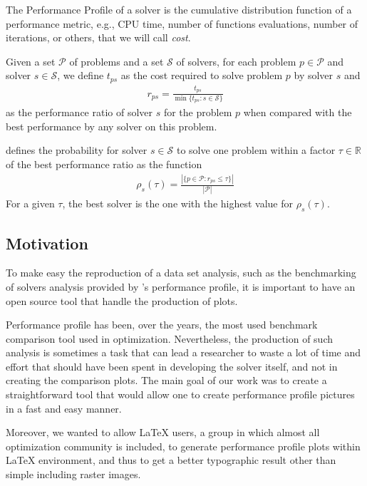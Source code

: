 \documentclass[10pt,a4paper]{article}
\def\Pset{\mathcal{P}}
\def\Sset{\mathcal{S}}
\begin{document}
The Performance Profile of a solver is the cumulative distribution
    function of a performance metric, e.g., CPU time, number of functions
    evaluations, number of iterations, or others, that we will call \emph{cost}.

    Given a set $\Pset$ of problems and a set $\Sset$ of solvers, for each problem $p
    \in \Pset$ and solver $s \in \Sset$, we define $t_{ps}$ as the cost
    required to solve problem $p$ by solver $s$ and
    \begin{align*}
      r_{ps} = \frac{t_{ps}}{\min\{t_{ps}: s \in \Sset\}}
    \end{align*}
    as the performance ratio of solver $s$ for the problem $p$ when compared
    with the best performance by any solver on this problem.

    \textcite{Dolan:2002du} defines the probability for solver $s \in \Sset$ to solve one
    problem within a factor $\tau \in \mathds{R}$ of the best performance
    ratio as the function
    \begin{align*}
      \rho_s(\tau) = \frac{| \{p \in \Pset: r_{ps} \leq \tau\} |}{| \Pset |}
    \end{align*}
     For a given $\tau$, the best solver is the one with the highest
    value for $\rho_s(\tau)$.

    \subsection*{Motivation}
    To make easy the reproduction of  a data set analysis, such as the  benchmarking of
    solvers analysis provided by \citeauthor{Dolan:2002du}'s performance profile, it is important to have an open source tool that handle the production of plots. 


    Performance profile has been, over the years, the most used benchmark comparison tool used in optimization. Nevertheless, the production of such analysis is sometimes a task that can lead a researcher to waste a lot of time and effort that should have been spent in developing the solver itself, and not in creating the comparison plots. The main goal of our work was to create  a straightforward  tool that would allow one to create performance profile pictures in a fast and easy manner. 

    Moreover,  we wanted to allow LaTeX users, a group in which almost all optimization community is included,  to   generate performance profile plots  within LaTeX environment, and thus to get a better typographic result other than simple including raster  images.
\end{document}
